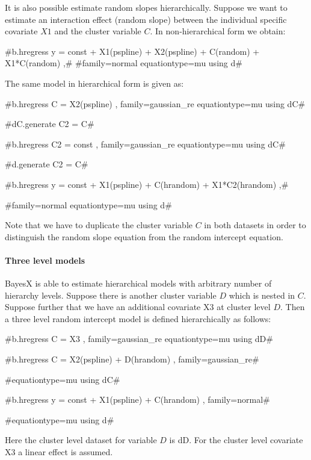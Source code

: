 $ $ \\

It is also possible estimate random slopes hierarchically. Suppose we want to estimate an interaction effect (random slope) between the individual specific covariate $X1$ and the cluster variable $C$. In non-hierarchical form we obtain:

#b.hregress y = const + X1(pspline)  + X2(pspline) + C(random) + X1*C(random) ,#
#family=normal equationtype=mu using d#

The same model in hierarchical form is given as:

#b.hregress C = X2(pspline) , family=gaussian_re equationtype=mu using dC#

#dC.generate C2 = C#

#b.hregress C2 = const , family=gaussian_re equationtype=mu using dC#

#d.generate C2 = C#

#b.hregress y = const + X1(pspline)  + C(hrandom) + X1*C2(hrandom) ,#

#family=normal equationtype=mu using d#

Note that we have to duplicate the cluster variable $C$ in both datasets in order to distinguish the random slope equation
from the random intercept equation.


\paragraph{Three level models}

$ $ \\

BayesX is able to estimate hierarchical models with arbitrary number of hierarchy levels. Suppose there is another cluster variable
$D$ which is nested in $C$. Suppose further that we have an additional covariate X3 at cluster level $D$. Then a three level random intercept
model is defined hierarchically as follows:

#b.hregress C = X3   , family=gaussian_re equationtype=mu using dD#

#b.hregress C = X2(pspline) + D(hrandom)  , family=gaussian_re#

#equationtype=mu using dC#

#b.hregress y = const + X1(pspline)  + C(hrandom) , family=normal#

#equationtype=mu using d#

Here the cluster level dataset for variable $D$ is dD. For the cluster level covariate X3 a linear effect is assumed.

